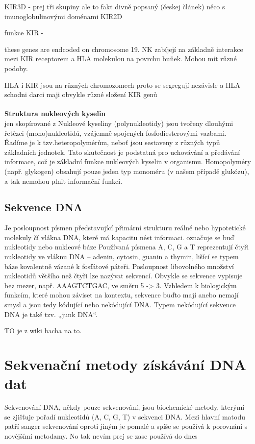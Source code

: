 \documentclass[czech,DP]{thesiskiv}
\begin{document}
KIR3D - prej tři skupiny ale to fakt divně popsaný (českej článek) něco s imunoglobulinovými doménami
KIR2D

funkce KIR - 

these genes are endcoded on chromosome 19. NK zabíjejí na základně interakce mezi KIR receptorem a HLA molekulou na povrchu buňek. Mohou mít různé podoby.

HLA i KIR jsou na různých chromozomech proto se segregují nezávisle a HLA schodni darci maji obvykle různé složení KIR genů
\\
\\
\textbf{Struktura nukleových kyselin} \\
jen skopírované z %
Nukleové kyseliny (polynukleotidy) jsou tvořeny dlouhými řetězci (mono)nukleotidů, vzájemně spojených fosfodiesterovými vazbami. Řadíme je k tzv.heteropolymérům, neboť jsou sestaveny z různých typů základních jednotek. Tato skutečnost je podstatná pro uchovávání a předávání informace, což je základní funkce nukleových kyselin v organismu. Homopolyméry (např. glykogen) obsahují pouze jeden typ monoméru (v našem případě glukózu), a tak nemohou plnit informační funkci.

\section{Sekvence DNA}
Je posloupnost písmen představující přimární strukturu reálné nebo hypotetické molekuly čí vlákna DNA, které má kapacitu nést informaci.
označuje se buď nukleotidy nebo nukleové báze
Používaná písmena A, C, G a T reprezentují čtyři nukleotidy ve vláknu DNA – adenin, cytosin, guanin a thymin, lišící se 
typem báze kovalentně vázané k fosfátové páteři. Posloupnost libovolného množství nukleotidů většího než čtyři lze nazývat 
sekvencí. Obvykle se sekvence vypisuje bez mezer, např. AAAGTCTGAC, ve směru 5 -> 3. Vzhledem k biologickým funkcím, které 
mohou záviset na kontextu, sekvence buďto mají anebo nemají smysl a jsou tedy kódující nebo nekódující DNA. Typem nekódující 
sekvence DNA je také tzv. „junk DNA“.

TO je z wiki bacha na to.


\chapter{Sekvenační metody získávání DNA dat}
Sekvenování DNA, někdy pouze sekvenování, jsou biochemické metody, kterými se zjišťuje pořadí nukleotidů (A, C, G, T) v sekvenci DNA. Mezi hlavní matodu patří sanger sekvenování oproti jiným je pomalé a spíše se používá k porovnání s novějšími metodamy. No tak nevím prej se zase používá do dnes
\cite{sekvenovani_ziva}
\\
\\
\end{document}
